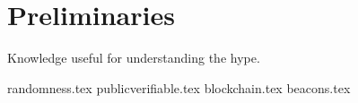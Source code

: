 \section{Preliminaries}\label{sec:preliminaries}
Knowledge useful for understanding the hype.

{randomness.tex}
{publicverifiable.tex}
{blockchain.tex}
{beacons.tex}
